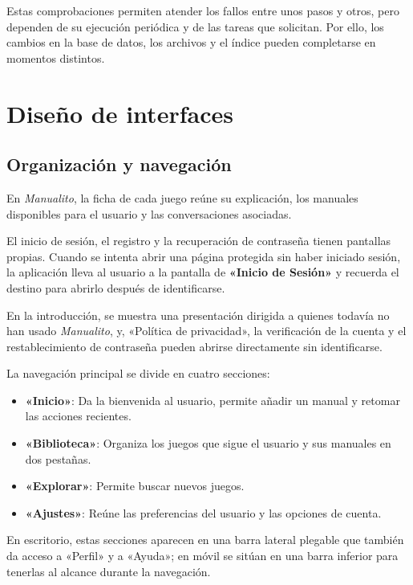 Estas comprobaciones permiten atender los fallos entre unos pasos y otros,
pero dependen de su ejecución periódica y de las tareas que solicitan.
Por ello, los cambios en la base de datos, los archivos y el índice pueden
completarse en momentos distintos.


\FloatBarrier

\section{Diseño de interfaces}

\FloatBarrier
\subsection{Organización y navegación}

En \textit{Manualito}, la ficha de cada juego reúne su explicación, los manuales
disponibles para el usuario y las conversaciones asociadas.

El inicio de sesión, el registro y la recuperación de contraseña tienen
pantallas propias. Cuando se intenta abrir una página protegida sin haber
iniciado sesión, la aplicación lleva al usuario a la pantalla de \textbf{«Inicio de Sesión»} y recuerda el
destino para abrirlo después de identificarse.

En la introducción, se muestra
una presentación dirigida a quienes todavía no han usado \textit{Manualito}, y, «Política de privacidad», la verificación de
la cuenta y el
restablecimiento de contraseña pueden abrirse directamente sin identificarse.

La navegación principal se divide en cuatro secciones:

\begin{itemize}
    \item \textbf{«Inicio»}: Da la bienvenida al usuario, permite añadir un manual y retomar las acciones recientes.
    \item \textbf{«Biblioteca»}: Organiza los juegos que sigue el usuario y sus manuales en dos pestañas.
    \item \textbf{«Explorar»}: Permite buscar nuevos juegos.
    \item \textbf{«Ajustes»}: Reúne las preferencias del usuario y las opciones de cuenta.
\end{itemize}

En escritorio, estas secciones aparecen en una barra lateral plegable
que también da acceso a «Perfil» y a «Ayuda»;
en móvil se sitúan en una barra inferior para tenerlas al alcance durante
la navegación.

